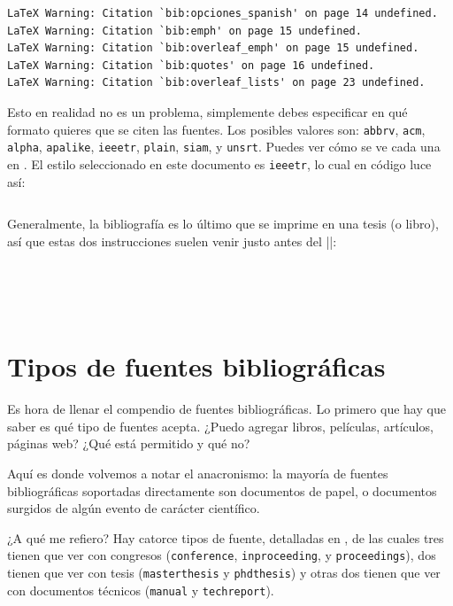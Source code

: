 \begin{lstlisting}[style=advertencias,mathescape=true]
LaTeX Warning: Citation `bib:opciones_spanish' on page 14 undefined.
LaTeX Warning: Citation `bib:emph' on page 15 undefined.
LaTeX Warning: Citation `bib:overleaf_emph' on page 15 undefined.
LaTeX Warning: Citation `bib:quotes' on page 16 undefined.
LaTeX Warning: Citation `bib:overleaf_lists' on page 23 undefined.
\end{lstlisting}

Esto en realidad no es un problema, simplemente debes especificar en qué formato quieres que se citen las fuentes. Los posibles valores son: \texttt{abbrv}, \texttt{acm}, \texttt{alpha}, \texttt{apalike}, \texttt{ieeetr}, \texttt{plain}, \texttt{siam}, y \texttt{unsrt}. Puedes ver cómo se ve cada una en \cite{bib:overleaf_bibtex}. El estilo seleccionado en este documento es \texttt{ieeetr}, lo cual en código luce así:

\begin{lstlisting}[style=latex]
% 

\end{lstlisting}

Generalmente, la bibliografía es lo último que se imprime en una tesis (o libro), así que estas dos instrucciones suelen venir justo antes del ||:

\begin{lstlisting}[style=latex]




\end{lstlisting}



\section{Tipos de fuentes bibliográficas}
\label{sec:tipos_de_fuentes_bibliograficas}



Es hora de llenar el compendio de fuentes bibliográficas. Lo primero que hay que saber es qué tipo de fuentes acepta. ¿Puedo agregar libros, películas, artículos, páginas web? ¿Qué está permitido y qué no?

Aquí es donde volvemos a notar el anacronismo: la mayoría de fuentes bibliográficas soportadas directamente son documentos de papel, o documentos surgidos de algún evento de carácter científico.

¿A qué me refiero? Hay catorce tipos de fuente, detalladas en \cite{bib:overleaf_bibtex}, de las cuales tres tienen que ver con congresos (\texttt{conference}, \texttt{inproceeding}, y \texttt{proceedings}), dos tienen que ver con tesis (\texttt{masterthesis} y \texttt{phdthesis}) y otras dos tienen que ver con documentos técnicos (\texttt{manual} y \texttt{techreport}).

